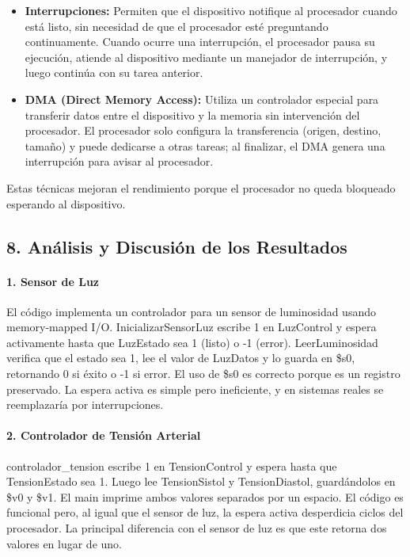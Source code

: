\documentclass[12pt]{article}
\begin{document}
\begin{itemize}
    \item \textbf{Interrupciones:} Permiten que el dispositivo notifique al procesador cuando está listo, sin necesidad de que el procesador esté preguntando continuamente. Cuando ocurre una interrupción, el procesador pausa su ejecución, atiende al dispositivo mediante un manejador de interrupción, y luego continúa con su tarea anterior.
    \item \textbf{DMA (Direct Memory Access):} Utiliza un controlador especial para transferir datos entre el dispositivo y la memoria sin intervención del procesador. El procesador solo configura la transferencia (origen, destino, tamaño) y puede dedicarse a otras tareas; al finalizar, el DMA genera una interrupción para avisar al procesador.
\end{itemize}

Estas técnicas mejoran el rendimiento porque el procesador no queda bloqueado esperando al dispositivo.

\begin{center}
\subsection*{8. Análisis y Discusión de los Resultados}
\end{center}

\paragraph*{1. Sensor de Luz}

El código implementa un controlador para un sensor de luminosidad usando memory-mapped I/O. InicializarSensorLuz escribe 1 en LuzControl y espera activamente hasta que LuzEstado sea 1 (listo) o -1 (error). LeerLuminosidad verifica que el estado sea 1, lee el valor de LuzDatos y lo guarda en \$s0, retornando 0 si éxito o -1 si error. El uso de \$s0 es correcto porque es un registro preservado. La espera activa es simple pero ineficiente, y en sistemas reales se reemplazaría por interrupciones.

\paragraph*{2. Controlador de Tensión Arterial}

controlador\_tension escribe 1 en TensionControl y espera hasta que TensionEstado sea 1. Luego lee TensionSistol y TensionDiastol, guardándolos en \$v0 y \$v1. El main imprime ambos valores separados por un espacio. El código es funcional pero, al igual que el sensor de luz, la espera activa desperdicia ciclos del procesador. La principal diferencia con el sensor de luz es que este retorna dos valores en lugar de uno.
\end{document}

